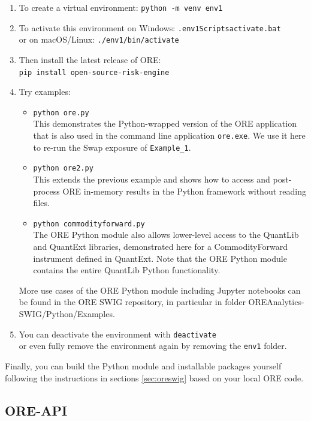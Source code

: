\begin{enumerate}
\item To create a virtual environment: {\tt python -m venv env1} 
\item To activate this environment on Windows: {\tt .{\bs}env1{\bs}Scripts{\bs}activate.bat}  \\
or on macOS/Linux: {\tt ./env1/bin/activate }  
\item Then install the latest release of ORE:\\
{\tt pip install open-source-risk-engine } 
\item Try examples:\\
  \begin{itemize} 
  \item {\tt python ore.py} \\
    This demonstrates the Python-wrapped version of the ORE application that is also used in the command line application
    {\tt ore.exe}. We use it here to re-run the Swap exposure of {\tt Example\_1}. 
  \item {\tt python ore2.py} \\
    This extends the previous example and shows how to access and post-process ORE in-memory results in the Python
    framework without reading files. 
  \item {\tt python commodityforward.py} \\
    The ORE Python module also allows lower-level access to the QuantLib and QuantExt libraries, demonstrated here for
    a CommodityForward instrument defined in QuantExt. 
    Note that the ORE Python module contains the entire QuantLib Python functionality.
  \end{itemize}
  More use cases of the ORE Python module including Jupyter notebooks can be found in the ORE SWIG repository,
  in particular in folder OREAnalytics-SWIG/Python/Examples. 
\item You can deactivate the environment with {\tt deactivate} \\
  or even fully remove the environment again by removing the {\tt env1} folder.
\end{enumerate}

Finally, you can build the Python module and installable packages yourself following the instructions in sections
\ref{sec:oreswig} based on your local ORE code. 

\subsection{ORE-API}\label{example:oreapi}

